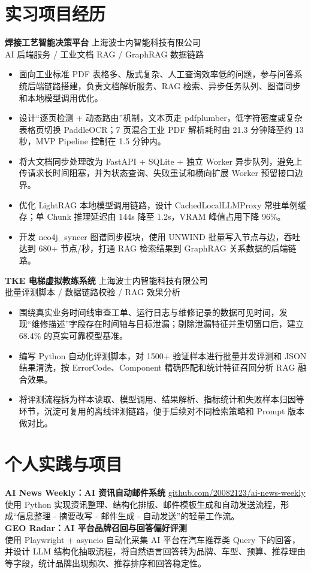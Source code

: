 \documentclass[10pt,a4paper]{article}
\begin{document}
\section*{实习项目经历}
\textbf{焊接工艺智能决策平台} \hfill 上海波士内智能科技有限公司\\
AI 后端服务 / 工业文档 RAG / GraphRAG 数据链路
\begin{itemize}
  \item 面向工业标准 PDF 表格多、版式复杂、人工查询效率低的问题，参与问答系统后端链路搭建，负责文档解析服务、RAG 检索、异步任务队列、图谱同步和本地模型调用优化。
  \item 设计“逐页检测 + 动态路由”机制，文本页走 pdfplumber，低字符密度或复杂表格页切换 PaddleOCR；7 页混合工业 PDF 解析耗时由 21.3 分钟降至约 13 秒，MVP Pipeline 控制在 1.5 分钟内。
  \item 将大文档同步处理改为 FastAPI + SQLite + 独立 Worker 异步队列，避免上传请求长时间阻塞，并为状态查询、失败重试和横向扩展 Worker 预留接口边界。
  \item 优化 LightRAG 本地模型调用链路，设计 CachedLocalLLMProxy 常驻单例缓存；单 Chunk 推理延迟由 144s 降至 1.2s，VRAM 峰值占用下降 96\%。
  \item 开发 neo4j\_syncer 图谱同步模块，使用 UNWIND 批量写入节点与边，吞吐达到 680+ 节点/秒，打通 RAG 检索结果到 GraphRAG 关系数据的后端链路。
\end{itemize}

\textbf{TKE 电梯虚拟教练系统} \hfill 上海波士内智能科技有限公司\\
批量评测脚本 / 数据链路校验 / RAG 效果分析
\begin{itemize}
  \item 围绕真实业务时间线审查工单、运行日志与维修记录的数据可见时间，发现“维修描述”字段存在时间轴与目标泄漏；剔除泄漏特征并重切窗口后，建立 68.4\% 的真实可靠模型基准。
  \item 编写 Python 自动化评测脚本，对 1500+ 验证样本进行批量并发评测和 JSON 结果清洗，按 ErrorCode、Component 精确匹配和统计特征召回分析 RAG 融合效果。
  \item 将评测流程拆为样本读取、模型调用、结果解析、指标统计和失败样本归因等环节，沉淀可复用的离线评测链路，便于后续对不同检索策略和 Prompt 版本做对比。
\end{itemize}

\section*{个人实践与项目}
\textbf{AI News Weekly：AI 资讯自动邮件系统} \hfill \href{https://github.com/20082123/ai-news-weekly}{github.com/20082123/ai-news-weekly}\\
使用 Python 实现资讯整理、结构化排版、邮件模板生成和自动发送流程，形成“信息整理 - 摘要改写 - 邮件生成 - 自动发送”的轻量工作流。\\[0.35em]
\textbf{GEO Radar：AI 平台品牌召回与回答偏好评测}\\
使用 Playwright + asyncio 自动化采集 AI 平台在汽车推荐类 Query 下的回答，并设计 LLM 结构化抽取流程，将自然语言回答转为品牌、车型、预算、推荐理由等字段，统计品牌出现频次、推荐排序和回答稳定性。
\end{document}
